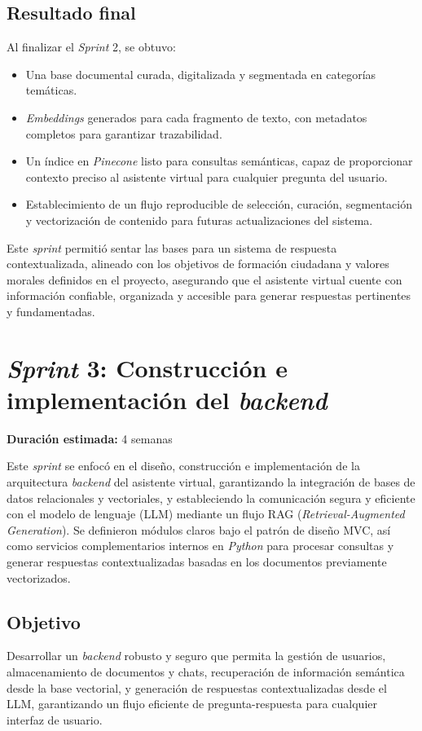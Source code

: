 \subsection{Resultado final}
Al finalizar el \textit{Sprint} 2, se obtuvo:

\begin{itemize}
      \item Una base documental curada, digitalizada y segmentada en categorías temáticas.
      \item \textit{Embeddings} generados para cada fragmento de texto, con metadatos completos para
            garantizar trazabilidad.
      \item Un índice en \textit{Pinecone} listo para consultas semánticas, capaz de
            proporcionar contexto preciso al asistente virtual para cualquier pregunta del
            usuario.
      \item Establecimiento de un flujo reproducible de selección, curación, segmentación y
            vectorización de contenido para futuras actualizaciones del sistema.
\end{itemize}

Este \textit{sprint} permitió sentar las bases para un sistema de respuesta
contextualizada, alineado con los objetivos de formación ciudadana y valores
morales definidos en el proyecto, asegurando que el asistente virtual cuente
con información confiable, organizada y accesible para generar respuestas
pertinentes y fundamentadas.

\section{\textit{Sprint} 3: Construcción e implementación del \textit{backend}}
\textbf{Duración estimada:} 4 semanas

Este \textit{sprint} se enfocó en el diseño, construcción e implementación de
la arquitectura \textit{backend} del asistente virtual, garantizando la
integración de bases de datos relacionales y vectoriales, y estableciendo la
comunicación segura y eficiente con el modelo de lenguaje (LLM) mediante un
flujo RAG (\textit{Retrieval-Augmented Generation}). Se definieron módulos
claros bajo el patrón de diseño MVC, así como servicios complementarios
internos en \textit{Python} para procesar consultas y generar respuestas
contextualizadas basadas en los documentos previamente vectorizados.

\subsection{Objetivo}
Desarrollar un \textit{backend} robusto y seguro que permita la gestión de
usuarios, almacenamiento de documentos y chats, recuperación de información
semántica desde la base vectorial, y generación de respuestas contextualizadas
desde el LLM, garantizando un flujo eficiente de pregunta-respuesta para
cualquier interfaz de usuario.

